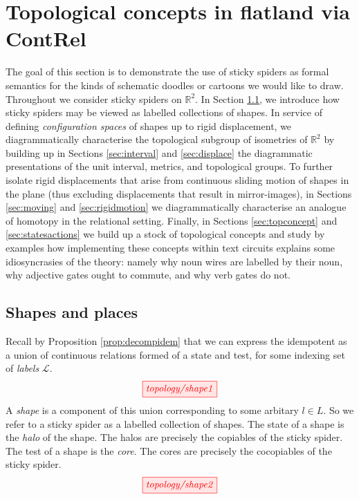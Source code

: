 \section{Topological concepts in flatland via \textbf{ContRel}}

\begin{fullwidth}

The goal of this section is to demonstrate the use of sticky spiders as formal semantics for the kinds of schematic doodles or cartoons we would like to draw. Throughout we consider sticky spiders on $\mathbb{R}^2$. In Section \ref{sec:shapes}, we introduce how sticky spiders may be viewed as labelled collections of shapes. In service of defining \emph{configuration spaces} of shapes up to rigid displacement, we diagrammatically characterise the topological subgroup of isometries of $\mathbb{R}^2$ by building up in Sections \ref{sec:interval} and \ref{sec:displace} the diagrammatic presentations of the unit interval, metrics, and topological groups. To further isolate rigid displacements that arise from continuous sliding motion of shapes in the plane (thus excluding displacements that result in mirror-images), in Sections \ref{sec:moving} and \ref{sec:rigidmotion} we diagrammatically characterise an analogue of homotopy in the relational setting. Finally, in Sections \ref{sec:topconcept} and \ref{sec:statesactions} we build up a stock of topological concepts and study by examples how implementing these concepts within text circuits explains some idiosyncrasies of the theory: namely why noun wires are labelled by their noun, why adjective gates ought to commute, and why verb gates do not.

\subsection{Shapes and places}\label{sec:shapes}

\begin{defn}
Recall by Proposition \ref{prop:decompidem} that we can express the idempotent as a union of continuous relations formed of a state and test, for some indexing set of \emph{labels} $\mathcal{L}$.
\[\tikzfig{topology/shape1}\]
A \emph{shape} is a component of this union corresponding to some arbitary $l \in L$. So we refer to a sticky spider as a labelled collection of shapes. The state of a shape is the \emph{halo} of the shape. The halos are precisely the copiables of the sticky spider. The test of a shape is the \emph{core}. The cores are precisely the cocopiables of the sticky spider.
\[\tikzfig{topology/shape2}\]
\end{defn}


\end{fullwidth}
